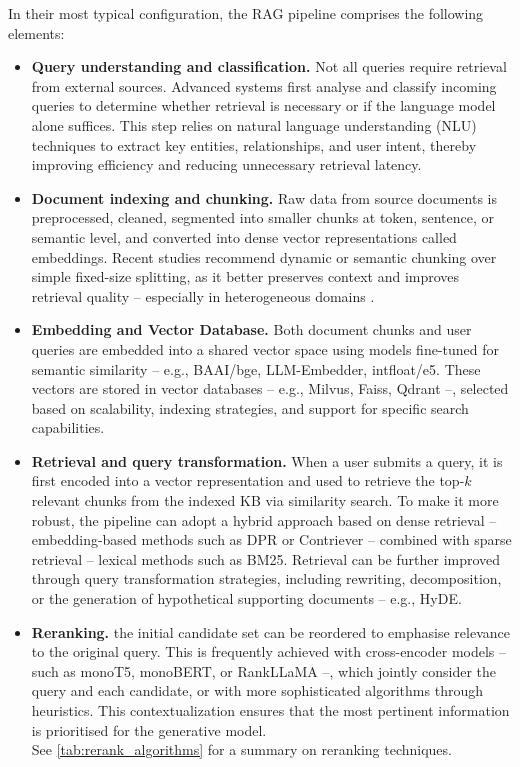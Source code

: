 \begin{spacing}{1.5}
In their most typical configuration, the RAG pipeline comprises the following elements:
\begin{itemize}
  \item \textbf{Query understanding and classification.} Not all queries require retrieval from external sources. Advanced systems first analyse and classify incoming queries to determine whether retrieval is necessary or if the language model alone suffices. This step relies on natural language understanding (NLU) techniques to extract key entities, relationships, and user intent, thereby improving efficiency and reducing unnecessary retrieval latency.
    \item \textbf{Document indexing and chunking.} Raw data from source documents is preprocessed, cleaned, segmented into smaller chunks at token, sentence, or semantic level, and converted into dense vector representations called embeddings. Recent studies recommend dynamic or semantic chunking over simple fixed-size splitting, as it better preserves context and improves retrieval quality -- especially in heterogeneous domains \citep{gao_precise_2022}.
    \item \textbf{Embedding and Vector Database.} Both document chunks and user queries are embedded into a shared vector space using models fine-tuned for semantic similarity -- e.g., BAAI/bge, LLM-Embedder, intfloat/e5. These vectors are stored in vector databases -- e.g., Milvus, Faiss, Qdrant --, selected based on scalability, indexing strategies, and support for specific search capabilities.
    \item \textbf{Retrieval and query transformation.} When a user submits a query, it is first encoded into a vector representation and used to retrieve the top-$k$ relevant chunks from the indexed KB via similarity search. To make it more robust, the pipeline can adopt a hybrid approach based on dense retrieval -- embedding-based methods such as DPR or Contriever -- combined with sparse retrieval -- lexical methods such as BM25. Retrieval can be further improved through query transformation strategies, including rewriting, decomposition, or the generation of hypothetical supporting documents -- e.g., HyDE.
    \item \textbf{Reranking.} the initial candidate set can be reordered to emphasise relevance to the original query. This is frequently achieved with cross-encoder models -- such as monoT5, monoBERT, or RankLLaMA --, which jointly consider the query and each candidate, or with more sophisticated algorithms through heuristics. This contextualization ensures that the most pertinent information is prioritised for the generative model.\\See \autoref{tab:rerank_algorithms} for a summary on reranking techniques.

\end{itemize}
\end{spacing}
